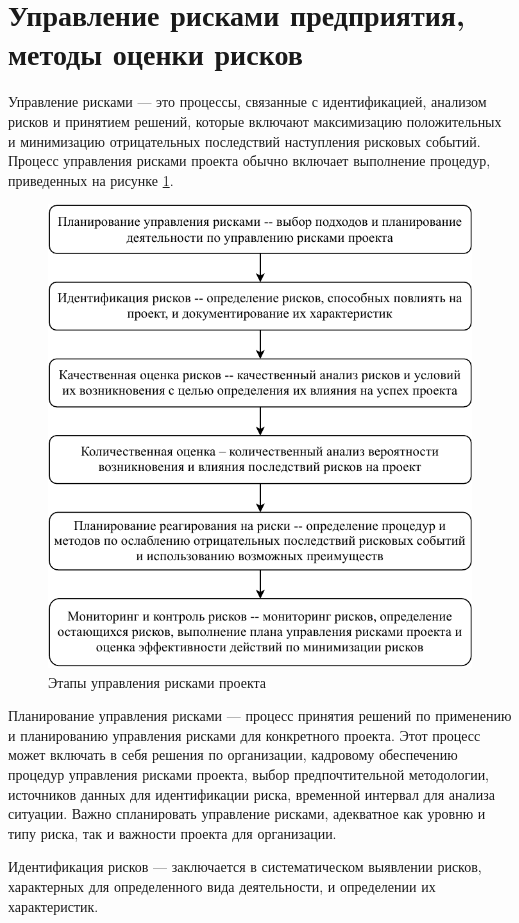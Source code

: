 \section{Управление рисками предприятия, методы оценки рисков}

Управление рисками --- это процессы, связанные с идентификацией, анализом рисков и принятием решений, которые включают максимизацию положительных и минимизацию отрицательных последствий наступления рисковых событий. Процесс управления рисками проекта обычно включает выполнение процедур, приведенных на рисунке \ref{fig:diagram-page-2}.

\begin{figure}[!h]
	\centering
	\includegraphics[width=0.7\linewidth]{Diagram-Page-2}
	\caption{Этапы управления рисками проекта}
	\label{fig:diagram-page-2}
\end{figure}

Планирование управления рисками --- процесс принятия решений по применению и планированию управления рисками для конкретного проекта. Этот процесс может включать в себя решения по организации, кадровому обеспечению процедур управления рисками проекта, выбор предпочтительной методологии, источников данных для идентификации риска, временной интервал для анализа ситуации. Важно спланировать управление рисками, адекватное как уровню и типу риска, так и важности проекта для организации.

Идентификация рисков --- заключается в систематическом выявлении рисков, характерных для определенного вида деятельности, и определении их характеристик.

